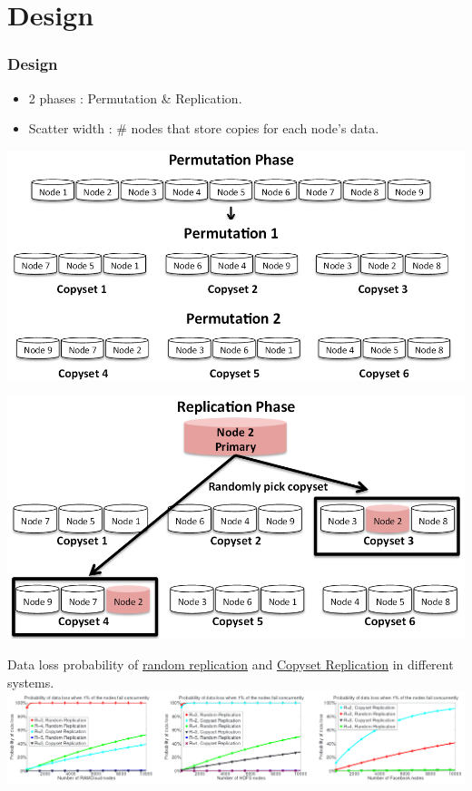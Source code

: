 \documentclass[xcolor=table]{beamer}
\begin{document}
	\section{Design}
	\begin{frame}
		\frametitle{Design}
		\begin{itemize}
			\small
			\item 2 phases : \alert{Permutation} \& \alert{Replication}.
			\item Scatter width : \# nodes that store copies for each node’s data.
		\end{itemize}
		\begin{minipage}[b]{0.49\linewidth}
			\centering
			\includegraphics[width=1\textwidth]{5.png}
		\end{minipage}
		\begin{minipage}[b]{0.49\linewidth}
			\centering
			\includegraphics[width=1\textwidth]{6.png}
		\end{minipage}
	\end{frame}

	\begin{frame}
		\small
		\alert{Data loss probability} of \underline{random replication} and \underline{Copyset Replication} in different systems.
		\includegraphics[width=1\textwidth]{7.png}
	\end{frame}
\end{document}
